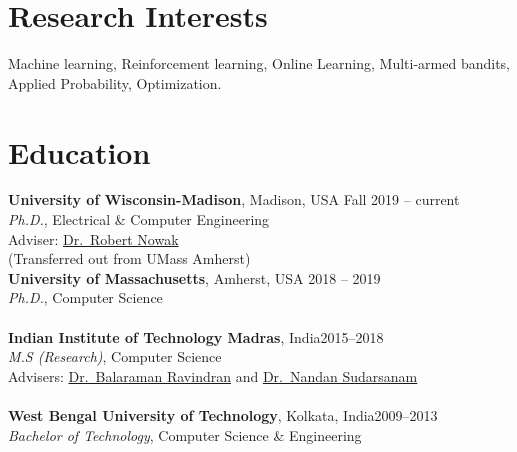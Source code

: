 \documentclass[margin,11pt]{res}
\begin{document}
\begin{resume}

\section{Research Interests}

Machine learning, Reinforcement learning, Online Learning, Multi-armed bandits, Applied Probability, Optimization.

%


\section{Education}
\textbf{University of Wisconsin-Madison}, Madison, USA \hfill Fall 2019 -- current\\
{\sl Ph.D.}, Electrical \& Computer Engineering \\
Adviser: \href{https://nowak.ece.wisc.edu/}{Dr.~Robert Nowak}\\
(Transferred out from UMass Amherst) \\[0.25cm]
\textbf{University of Massachusetts}, Amherst, USA \hfill 2018 -- 2019\\
{\sl Ph.D.}, Computer Science \\
\\[0.25cm]
\textbf{Indian Institute of Technology Madras}, India\hfill 2015--2018 \\
{\sl M.S (Research)}, Computer Science \\
Advisers: \href{https://www.cse.iitm.ac.in/~ravi/}{Dr.~Balaraman Ravindran} and \href{https://doms.iitm.ac.in/index.php/nandan-s}{Dr.~Nandan Sudarsanam}\\
\\[0.25cm]
\textbf{West Bengal University of Technology}, Kolkata, India\hfill 2009--2013\\
{\sl Bachelor of Technology}, Computer Science \& Engineering

\end{resume}
\end{document}
